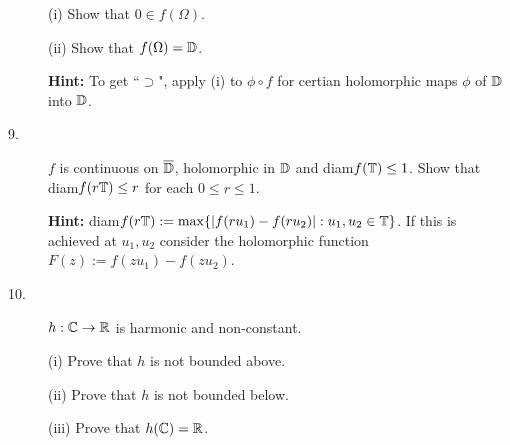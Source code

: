 \documentclass{article}
\begin{document}
\begin{description}
\item[\quad] (i)
Show that $0 \in f(\Omega)$.

\item[\quad] (ii)
Show that $f(\Omega) = \Bbb D$.

{\bf Hint:} To get ``$\supset$", apply (i) to $\phi \circ f$ for certian
holomorphic maps $\phi$ of $\Bbb D$ into $\Bbb D$.

\item[9.]
$f$ is continuous on $\overline{\Bbb D}$, holomorphic in $\Bbb D$ and
diam$f(\Bbb T) \leq 1$. Show that diam$f(r\Bbb T) \leq r$ for each
$0 \leq r \leq 1$.

{\bf Hint:}
diam$f(r \Bbb T) := \max \{|f(ru_1) - f(ru_2)| : u_1, u_2 \in \Bbb T\}$.
If this is achieved at $u_1, u_2$ consider the holomorphic function
$F(z) := f(zu_1) - f(zu_2)$.

\item[10.]
$h :\Bbb C \to \Bbb R$ is harmonic and non-constant.

\item[\quad] (i)
Prove that $h$ is not bounded above.

\item[\quad] (ii)
Prove that $h$ is not bounded below.

\item[\quad] (iii)
Prove that $h(\Bbb C) = \Bbb R$.





\end{description}    
\end{document}
